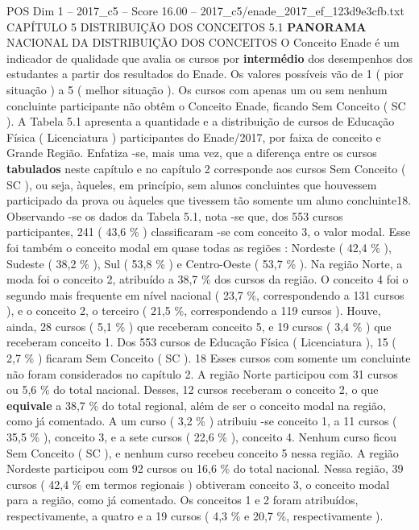 \begin{textsample}{POS Dim 1 – 2017\_c5 – Score 16.00 – 2017\_c5/enade\_2017\_ef\_123d9e3cfb.txt}  \label{ex:f1_pos_052}
CAPÍTULO 5 DISTRIBUIÇÃO DOS CONCEITOS 5.1 \textbf{PANORAMA} NACIONAL DA DISTRIBUIÇÃO DOS CONCEITOS O Conceito Enade é um indicador de qualidade que avalia os cursos por \textbf{intermédio} dos desempenhos dos estudantes a partir dos resultados do Enade.
Os valores possíveis vão de 1 ( pior situação ) a 5 ( melhor situação ).
Os cursos com apenas um ou sem nenhum concluinte participante não obtêm o Conceito Enade, ficando Sem Conceito ( SC ).
A Tabela 5.1 apresenta a quantidade e a distribuição de cursos de Educação Física ( Licenciatura ) participantes do Enade/2017, por faixa de conceito e Grande Região.
Enfatiza -se, mais uma vez, que a diferença entre os cursos \textbf{tabulados} neste capítulo e no capítulo 2 corresponde aos cursos Sem Conceito ( SC ), ou seja, àqueles, em princípio, sem alunos concluintes que houvessem participado da prova ou àqueles que tivessem tão somente um aluno concluinte18.
Observando -se os dados da Tabela 5.1, nota -se que, dos 553 cursos participantes, 241 ( 43,6 \% ) classificaram -se com conceito 3, o valor modal.
Esse foi também o conceito modal em quase todas as regiões : Nordeste ( 42,4 \% ), Sudeste ( 38,2 \% ), Sul ( 53,8 \% ) e Centro-Oeste ( 53,7 \% ).
Na região Norte, a moda foi o conceito 2, atribuído a 38,7 \% dos cursos da região.
O conceito 4 foi o segundo mais frequente em nível nacional ( 23,7 \%, correspondendo a 131 cursos ), e o conceito 2, o terceiro ( 21,5 \%, correspondendo a 119 cursos ).
Houve, ainda, 28 cursos ( 5,1 \% ) que receberam conceito 5, e 19 cursos ( 3,4 \% ) que receberam conceito 1.
Dos 553 cursos de Educação Física ( Licenciatura ), 15 ( 2,7 \% ) ficaram Sem Conceito ( SC ). 18 Esses cursos com somente um concluinte não foram considerados no capítulo 2.
A região Norte participou com 31 cursos ou 5,6 \% do total nacional.
Desses, 12 cursos receberam o conceito 2, o que \textbf{equivale} a 38,7 \% do total regional, além de ser o conceito modal na região, como já comentado.
A um curso ( 3,2 \% ) atribuiu -se conceito 1, a 11 cursos ( 35,5 \% ), conceito 3, e a sete cursos ( 22,6 \% ), conceito 4.
Nenhum curso ficou Sem Conceito ( SC ), e nenhum curso recebeu conceito 5 nessa região.
A região Nordeste participou com 92 cursos ou 16,6 \% do total nacional.
Nessa região, 39 cursos ( 42,4 \% em termos regionais ) obtiveram conceito 3, o conceito modal para a região, como já comentado.
Os conceitos 1 e 2 foram atribuídos, respectivamente, a quatro e a 19 cursos ( 4,3 \% e 20,7 \%, respectivamente ).

\end{textsample}
